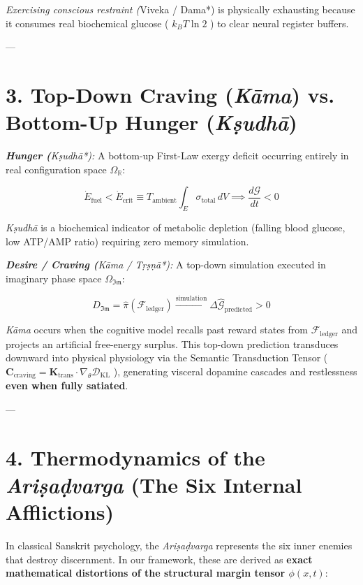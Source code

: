 \documentclass[11pt,a4paper]{article}
\theoremstyle{definition}
\theoremstyle{remark}
\begin{document}
\textit{ Exercising conscious restraint (}Viveka / Dama*) is physically exhausting because it consumes real biochemical glucose ( $k_B T \ln 2$ ) to clear neural register buffers.

---

\section{3. Top-Down Craving (\textit{Kāma}) vs. Bottom-Up Hunger (\textit{Kṣudhā})}

\textit{ \textbf{Hunger (}Kṣudhā*):}
A bottom-up First-Law exergy deficit occurring entirely in real configuration space $\Omega_{\mathbb{R}}$:


\begin{equation}
\dot{E}_{\text{fuel}} < \dot{E}_{\text{crit}} \equiv T_{\text{ambient}} \int_E \sigma_{\text{total}} \, dV \implies \frac{d\mathcal{G}}{dt} < 0
\end{equation}


\textit{Kṣudhā} is a biochemical indicator of metabolic depletion (falling blood glucose, low ATP/AMP ratio) requiring zero memory simulation.

\textit{ \textbf{Desire / Craving (}Kāma / Tṛṣṇā*):}
A top-down simulation executed in imaginary phase space $\Omega_{\mathfrak{Im}}$:


\begin{equation}
D_{\mathfrak{Im}} = \hat{\pi}(\mathcal{F}_{\text{ledger}}) \xrightarrow{\text{simulation}} \Delta \hat{\mathcal{G}}_{\text{predicted}} > 0
\end{equation}


\textit{Kāma} occurs when the cognitive model recalls past reward states from $\mathcal{F}_{\text{ledger}}$ and projects an artificial free-energy surplus. This top-down prediction transduces downward into physical physiology via the Semantic Transduction Tensor ( $\mathbf{C}_{\text{craving}} = \mathbf{K}_{\text{trans}} \cdot \nabla_\theta \mathcal{D}_{\text{KL}}$ ), generating visceral dopamine cascades and restlessness \textbf{even when fully satiated}.

---

\section{4. Thermodynamics of the \textit{Ariṣaḍvarga} (The Six Internal Afflictions)}

In classical Sanskrit psychology, the \textit{Ariṣaḍvarga} represents the six inner enemies that destroy discernment. In our framework, these are derived as \textbf{exact mathematical distortions of the structural margin tensor $\phi(x, t)$}:
\end{document}
